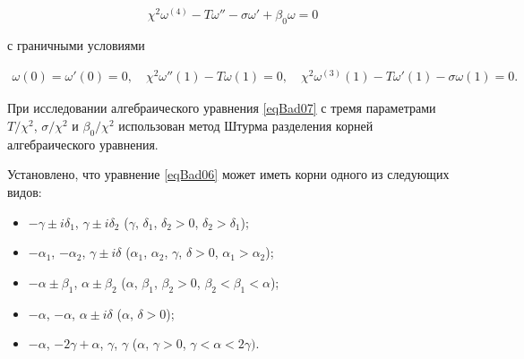 \begin{equation}

\chi^2 \omega^{(4)}-T \omega'' -\sigma \omega'+ \beta_0\omega=0 

\label{eqBad07}

\end{equation}

с граничными условиями

\begin{eqnarray*}

\omega(0)=\omega'(0)=0,\quad 

\chi^2 \omega''(1)-T \omega(1)=0, \quad 

\chi^2 \omega^{(3)}(1)-T \omega'(1)-\sigma \omega(1)=0.

\end{eqnarray*}



При исследовании алгебраического уравнения \eqref{eqBad07} с тремя параметрами ${T}/{\chi^2}$, ${\sigma}/{\chi^2}$ и ${\beta_0}/{\chi^2}$ использован метод Штурма разделения корней алгебраического уравнения.  

Установлено, что уравнение \eqref{eqBad06} может иметь корни одного из следующих видов:



\begin{itemize}

\item[\bf A)] $-\gamma\pm i\delta_1 $, $\gamma\pm i\delta_2 $ ($\gamma$, $\delta_1$, $\delta_2 >0$, $\delta_2>\delta_1$);



\item[\bf B)] $-\alpha_1$, $-\alpha_2$, $\gamma\pm i\delta $ ($\alpha_1$, $\alpha_2$, $\gamma$,  $\delta>0$, $\alpha_1>\alpha_2$);



\item[\bf C)] $-\alpha \pm \beta_1$, $\alpha \pm \beta_2$ ($\alpha$, $\beta_1$, $\beta_2>0$, $\beta_2<\beta_1<\alpha$);



\item[\bf A--B)] $-\alpha $, $-\alpha $, $\alpha \pm i\delta $ ($ \alpha$, $\delta>0$);



\item[\bf B--C)] $-\alpha $, $ -2\gamma+\alpha$, $\gamma$, $\gamma$ ($\alpha$, $\gamma>0$, $\gamma<\alpha<2\gamma)$.



\end{itemize}





